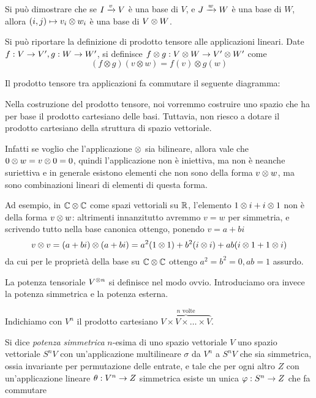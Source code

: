   Si può dimostrare che se $I \xrightarrow v V$ è una base di $V$, e $J \xrightarrow w W$ è una base di $W$, allora $(i,j) \mapsto v_i \otimes w_i$ è una base di $V\otimes W$.

  \begin{mydef}
    Si può riportare la definizione di prodotto tensore alle applicazioni lineari. Date $f:V \rightarrow V', g: W \rightarrow W'$, si definisce $f\otimes g: V\otimes W \rightarrow V'\otimes W'$ come
      \[
	(f \otimes g)(v\otimes w)=f(v)\otimes g(w) 
      \]
    
    Il prodotto tensore tra applicazioni fa commutare il seguente diagramma:
    
   
   \end{mydef}

  \begin{myobs}
   Nella costruzione del prodotto tensore, noi vorremmo costruire uno spazio che ha per base il prodotto cartesiano delle basi. Tuttavia, non riesco a dotare il prodotto cartesiano della struttura di spazio vettoriale.
   
   Infatti se voglio che l'applicazione $\otimes$ sia bilineare, allora vale che $0 \otimes w = v \otimes 0 = 0$, quindi l'applicazione non è iniettiva, ma non è neanche suriettiva e in generale esistono elementi che non sono della forma $v \otimes w$, ma sono combinazioni lineari di elementi di questa forma.
  \end{myobs}
  \begin{myexample}
  
   Ad esempio, in $\mathbb C \otimes \mathbb C$ come spazi vettoriali su $\mathbb R$, l'elemento $1 \otimes i + i \otimes 1$ non è della forma $v\otimes w$: altrimenti innanzitutto avremmo $v=w$ per simmetria, e scrivendo tutto nella base canonica ottengo, ponendo $v=a+bi$
   \[
    v\otimes v= (a+bi)\otimes (a+bi) = a^2(1\otimes 1) + b^2 (i\otimes i) + ab(i\otimes 1 +1\otimes i)
   \]
   da cui per le proprietà della base su $\mathbb C\otimes \mathbb C$ ottengo $a^2=b^2=0, ab=1$ assurdo.

  \end{myexample}
  
  La potenza tensoriale $V^{\otimes n}$ si definisce nel modo ovvio. Introduciamo ora invece la potenza simmetrica e la potenza esterna.
   
  \begin{mydef}
   Indichiamo con $V^n$ il prodotto cartesiano $\overbrace{V \times V \times \dots \times V}^{n \textrm{ volte}}$.
   
   Si dice \emph{potenza simmetrica} $n$-esima di uno spazio vettoriale $V$ uno spazio vettoriale $S^nV$ con un'applicazione multilineare $\sigma$ da $V^n$ a $S^nV$ che sia simmetrica, ossia invariante per permutazione delle entrate, e tale che per ogni altro $Z$ con un'applicazione lineare $\theta: V^n \rightarrow Z$ simmetrica esiste un unica $\varphi: S^n \rightarrow Z$ che fa commutare 
   
  
  \end{mydef}

